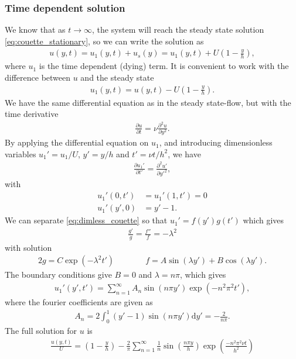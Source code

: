 \documentclass[a4paper,10pt]{article}
\renewcommand{\(}{\left(}
\renewcommand{\)}{\right)}
\newcommand{\dm}[1]{\text{d}#1}
\newcommand{\dpart}[2]{\frac{\partial#1}{\partial#2}}
\newcommand{\dpartt}[2]{\frac{\partial^2#1}{\partial#2^2}}
\begin{document}
\subsubsection{Time dependent solution}
We know that as $t\rightarrow\infty$, the system will reach the steady state solution \eqref{eq:couette_stationary}, so we can write the solution as
\begin{align*}
  u(y,t) = u_1(y,t) + u_s(y) = u_1(y,t) + U\left(1 - \frac{y}{h}\right),
\end{align*}
where $u_1$ is the time dependent (dying) term. It is convenient to work with the difference between $u$ and the steady state
\begin{align*}
  u_1(y,t) = u(y,t) - U\left(1 - \frac{y}{h}\right).
\end{align*}
We have the same differential equation as in the steady state-flow, but with the time derivative
\begin{align*}
  \dpart{u}{t} = \nu\dpartt{u}{y}.
\end{align*}
By applying the differential equation on $u_1$, and introducing dimensionless variables $u_1' = u_1/U$, $y' = y/h$ and $t' = \nu t/h^2$, we have
\begin{align}
  \label{eq:dimless_couette}
  \dpart{u_1'}{t'} = \dpartt{u'}{y'},
\end{align}
with 
\begin{align*}
  u_1'(0,t') &= u_1'(1,t') = 0\\
  u_1'(y',0) &= y' - 1.
\end{align*}
We can separate \eqref{eq:dimless_couette} so that $u_1' = f(y')g(t')$ which gives
\begin{align*}
  \frac{g'}{g} = \frac{f''}{f} = -\lambda^2
\end{align*}
with solution
\begin{alignat*}{2}
  g = C\exp(-\lambda^2t') & \qquad\quad f = A\sin(\lambda y') + B\cos(\lambda y').
\end{alignat*}
The boundary conditions give $B=0$ and $\lambda=n\pi$, which gives
\begin{align*}
  u_1'(y',t') = \sum_{n=1}^\infty A_n \sin\left(n\pi y'\right)\exp\left(-n^2\pi^2t'\right),
\end{align*}
where the fourier coefficients are given as
\begin{align*}
  A_n = 2\int_{0}^1 (y' - 1)\sin\left(n\pi y'\right) \dm y' = -\frac{2}{n\pi}.
\end{align*}
The full solution for $u$ is
\begin{align}
\label{eq:couette_full}
  \frac{u(y,t)}{U} = \left(1 - \frac{y}{h}\right) - \frac{2}{\pi}\sum_{n=1}^\infty \frac{1}{n} \sin\left(\frac{n\pi y}{h}\right)\exp\left(\frac{-n^2\pi^2 \nu t}{h^2}\right)
\end{align}
\end{document}
